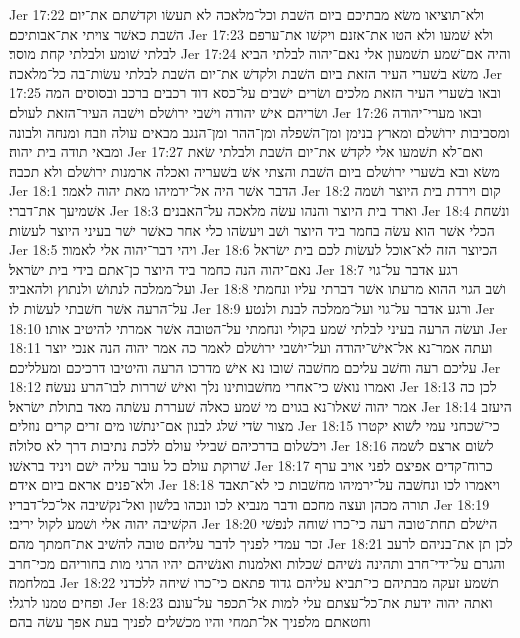 Jer 17:22  ולא־תוציאו משׂא מבתיכם ביום השׁבת וכל־מלאכה לא תעשׂו וקדשׁתם את־יום השׁבת כאשׁר צויתי את־אבותיכם׃
Jer 17:23  ולא שׁמעו ולא הטו את־אזנם ויקשׁו את־ערפם לבלתי שׁומע ולבלתי קחת מוסר׃
Jer 17:24  והיה אם־שׁמע תשׁמעון אלי נאם־יהוה לבלתי הביא משׂא בשׁערי העיר הזאת ביום השׁבת ולקדשׁ את־יום השׁבת לבלתי עשׂות־בה כל־מלאכה׃
Jer 17:25  ובאו בשׁערי העיר הזאת מלכים ושׂרים ישׁבים על־כסא דוד רכבים ברכב ובסוסים המה ושׂריהם אישׁ יהודה וישׁבי ירושׁלם וישׁבה העיר־הזאת לעולם׃
Jer 17:26  ובאו מערי־יהודה ומסביבות ירושׁלם ומארץ בנימן ומן־השׁפלה ומן־ההר ומן־הנגב מבאים עולה וזבח ומנחה ולבונה ומבאי תודה בית יהוה׃
Jer 17:27  ואם־לא תשׁמעו אלי לקדשׁ את־יום השׁבת ולבלתי שׂאת משׂא ובא בשׁערי ירושׁלם ביום השׁבת והצתי אשׁ בשׁעריה ואכלה ארמנות ירושׁלם ולא תכבה׃
Jer 18:1  הדבר אשׁר היה אל־ירמיהו מאת יהוה לאמר׃
Jer 18:2  קום וירדת בית היוצר ושׁמה אשׁמיעך את־דברי׃
Jer 18:3  וארד בית היוצר והנהו עשׂה מלאכה על־האבנים׃
Jer 18:4  ונשׁחת הכלי אשׁר הוא עשׂה בחמר ביד היוצר ושׁב ויעשׂהו כלי אחר כאשׁר ישׁר בעיני היוצר לעשׂות׃
Jer 18:5  ויהי דבר־יהוה אלי לאמור׃
Jer 18:6  הכיוצר הזה לא־אוכל לעשׂות לכם בית ישׂראל נאם־יהוה הנה כחמר ביד היוצר כן־אתם בידי בית ישׂראל׃
Jer 18:7  רגע אדבר על־גוי ועל־ממלכה לנתושׁ ולנתוץ ולהאביד׃
Jer 18:8  ושׁב הגוי ההוא מרעתו אשׁר דברתי עליו ונחמתי על־הרעה אשׁר חשׁבתי לעשׂות לו׃
Jer 18:9  ורגע אדבר על־גוי ועל־ממלכה לבנת ולנטע׃
Jer 18:10  ועשׂה הרעה בעיני לבלתי שׁמע בקולי ונחמתי על־הטובה אשׁר אמרתי להיטיב אותו׃
Jer 18:11  ועתה אמר־נא אל־אישׁ־יהודה ועל־יושׁבי ירושׁלם לאמר כה אמר יהוה הנה אנכי יוצר עליכם רעה וחשׁב עליכם מחשׁבה שׁובו נא אישׁ מדרכו הרעה והיטיבו דרכיכם ומעלליכם׃
Jer 18:12  ואמרו נואשׁ כי־אחרי מחשׁבותינו נלך ואישׁ שׁררות לבו־הרע נעשׂה׃
Jer 18:13  לכן כה אמר יהוה שׁאלו־נא בגוים מי שׁמע כאלה שׁעררת עשׂתה מאד בתולת ישׂראל׃
Jer 18:14  היעזב מצור שׂדי שׁלג לבנון אם־ינתשׁו מים זרים קרים נוזלים׃
Jer 18:15  כי־שׁכחני עמי לשׁוא יקטרו ויכשׁלום בדרכיהם שׁבילי עולם ללכת נתיבות דרך לא סלולה׃
Jer 18:16  לשׂום ארצם לשׁמה שׁרוקת עולם כל עובר עליה ישׁם ויניד בראשׁו׃
Jer 18:17  כרוח־קדים אפיצם לפני אויב ערף ולא־פנים אראם ביום אידם׃
Jer 18:18  ויאמרו לכו ונחשׁבה על־ירמיהו מחשׁבות כי לא־תאבד תורה מכהן ועצה מחכם ודבר מנביא לכו ונכהו בלשׁון ואל־נקשׁיבה אל־כל־דבריו׃
Jer 18:19  הקשׁיבה יהוה אלי ושׁמע לקול יריבי׃
Jer 18:20  הישׁלם תחת־טובה רעה כי־כרו שׁוחה לנפשׁי זכר עמדי לפניך לדבר עליהם טובה להשׁיב את־חמתך מהם׃
Jer 18:21  לכן תן את־בניהם לרעב והגרם על־ידי־חרב ותהינה נשׁיהם שׁכלות ואלמנות ואנשׁיהם יהיו הרגי מות בחוריהם מכי־חרב במלחמה׃
Jer 18:22  תשׁמע זעקה מבתיהם כי־תביא עליהם גדוד פתאם כי־כרו שׁיחה ללכדני ופחים טמנו לרגלי׃
Jer 18:23  ואתה יהוה ידעת את־כל־עצתם עלי למות אל־תכפר על־עונם וחטאתם מלפניך אל־תמחי והיו מכשׁלים לפניך בעת אפך עשׂה בהם׃
